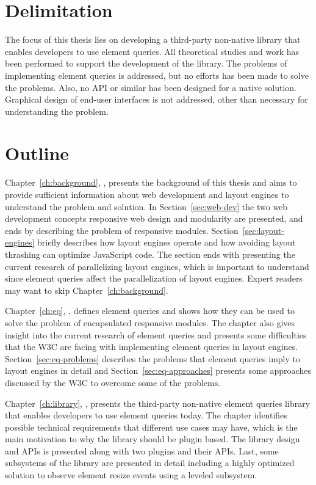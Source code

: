 \documentclass[a4paper,11pt]{kth-mag}
\begin{document}
    \section{Delimitation}
      The focus of this thesis lies on developing a \gls{third-party} non-\gls{native} library that enables developers to use element queries.
      All theoretical studies and work has been performed to support the development of the library.
      The problems of implementing element queries  is addressed, but no efforts has been made to solve the problems.
      Also, no \gls{API} or similar has been designed for a \gls{native} solution.
      Graphical design of end-user interfaces is not addressed, other than necessary for understanding the problem.
    \section{Outline}
      \newcommand{\chref}[1]{Chapter~\ref{#1}, \emph{\nameref{#1}},}
      \chref{ch:background} presents the background of this thesis and aims to provide sufficient information about \gls{web} development and \glspl{layout engine} to understand the problem and solution.
      In Section~\ref{sec:web-dev} the two \gls{web} development concepts \gls{responsive} \gls{web} design and modularity are presented, and ends by describing the problem of \gls{responsive} modules.
      Section~\ref{sec:layout-engines} briefly describes how \glspl{layout engine} operate and how avoiding \gls{layout thrashing} can optimize \gls{JavaScript} code.
      The section ends with presenting the current research of parallelizing \glspl{layout engine}, which is important to understand since element queries affect the parallelization of \glspl{layout engine}.
      Expert readers may want to skip Chapter~\ref{ch:background}.

      \chref{ch:eq} defines element queries and shows how they can be used to solve the problem of \gls{encapsulated} \gls{responsive} modules.
      The chapter also gives insight into the current research of element queries and presents some difficulties that the W3C are facing with implementing element queries in \glspl{layout engine}.
      Section~\ref{sec:eq-problems} describes the problems that element queries imply to \glspl{layout engine} in detail and Section~\ref{sec:eq-approaches} presents some approaches discussed by the W3C to overcome some of the problems.

      \chref{ch:library} presents the \gls{third-party} non-\gls{native} element queries library that enables developers to use element queries today.
      The chapter identifies possible technical requirements that different use cases may have, which is the main motivation to why the library should be plugin based.
      The library design and \glspl{API} is presented along with two plugins and their \glspl{API}.
      Last, some subsystems of the library are presented in detail including a highly optimized solution to observe element resize events using a leveled  subsystem.
\end{document}
